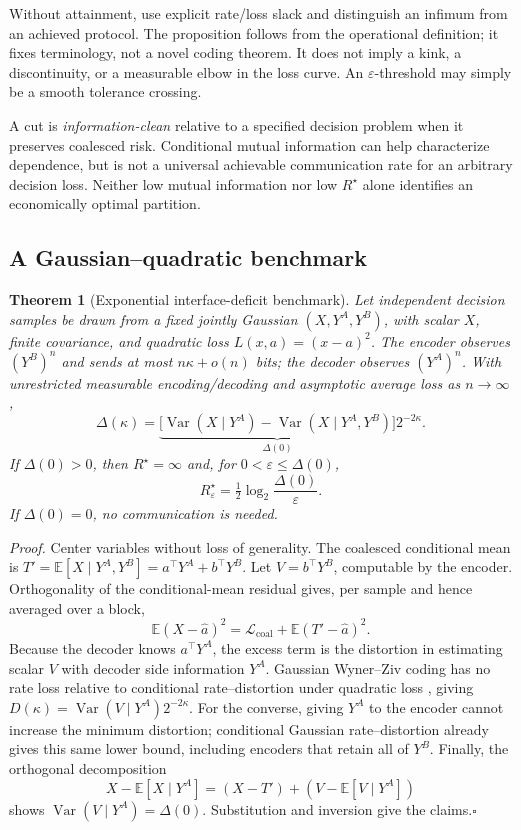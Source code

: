 \documentclass[11pt]{article}
\newtheorem{theorem}{Theorem}
\newcommand{\E}{\mathbb{E}}
\begin{document}
Without attainment, use explicit rate/loss slack and distinguish an infimum
from an achieved protocol. The proposition follows from the operational
definition; it fixes terminology, not a novel coding theorem. It does not
imply a kink, a discontinuity, or a measurable elbow in the loss curve.
An $\varepsilon$-threshold may simply be a smooth tolerance crossing.

A cut is \emph{information-clean} relative to a specified decision problem
when it preserves coalesced risk. Conditional mutual information can help
characterize dependence, but is not a universal achievable communication rate
for an arbitrary decision loss. Neither low mutual information nor low
$R^\star$ alone identifies an economically optimal partition.

\subsection{A Gaussian--quadratic benchmark}

\begin{theorem}[Exponential interface-deficit benchmark]
\label{thm:deficit}
Let independent decision samples be drawn from a fixed jointly Gaussian
$(X,Y^A,Y^B)$, with scalar $X$, finite covariance, and quadratic loss
$L(x,a)=(x-a)^2$. The encoder observes $(Y^B)^n$ and sends at most
$n\kappa+o(n)$ bits; the decoder observes $(Y^A)^n$. With unrestricted
measurable encoding/decoding and asymptotic average loss as $n\to\infty$,
\[
\Delta(\kappa)=
\underbrace{\big[\operatorname{Var}(X\mid Y^A)
-\operatorname{Var}(X\mid Y^A,Y^B)\big]}_{\Delta(0)}
2^{-2\kappa}.
\]
If $\Delta(0)>0$, then $R^\star=\infty$ and, for
$0<\varepsilon\leq\Delta(0)$,
\[
R^\star_\varepsilon=\tfrac12\log_2\frac{\Delta(0)}{\varepsilon}.
\]
If $\Delta(0)=0$, no communication is needed.
\end{theorem}
\noindent\textit{Proof.} Center variables without loss of generality.
The coalesced conditional mean is
$T'=\E[X\mid Y^A,Y^B]=a^\top Y^A+b^\top Y^B$.
Let $V=b^\top Y^B$, computable by the encoder. Orthogonality of the
conditional-mean residual gives, per sample and hence averaged over a block,
\[
\E(X-\hat a)^2=\mathcal L_{\mathrm{coal}}
+\E(T'-\hat a)^2.
\]
Because the decoder knows $a^\top Y^A$, the excess term is the distortion
in estimating scalar $V$ with decoder side information $Y^A$.
Gaussian Wyner--Ziv coding has no rate loss relative to conditional
rate--distortion under quadratic loss \cite{wynerziv1976,wyner1978}, giving
$D(\kappa)=\operatorname{Var}(V\mid Y^A)2^{-2\kappa}$.
For the converse, giving $Y^A$ to the encoder cannot increase the minimum
distortion; conditional Gaussian rate--distortion already gives this same
lower bound, including encoders that retain all of $Y^B$.
Finally, the orthogonal decomposition
\[
X-\E[X\mid Y^A]=(X-T')+(V-\E[V\mid Y^A])
\]
shows $\operatorname{Var}(V\mid Y^A)=\Delta(0)$. Substitution and inversion
give the claims.\hfill$\square$
\end{document}

